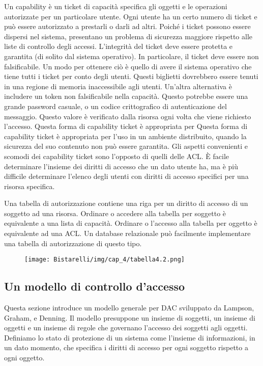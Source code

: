 Un capability è un ticket di capacità specifica gli oggetti e le operazioni autorizzate per un particolare utente. Ogni utente ha un certo numero di ticket e può essere autorizzato a prestarli o darli ad altri. Poiché i ticket possono essere dispersi nel sistema, presentano un problema di sicurezza maggiore rispetto alle liste di controllo degli accessi. L'integrità del ticket deve essere protetta e garantita (di solito dal sistema operativo). In particolare, il ticket deve essere non falsificabile. Un modo per ottenere ciò è quello di avere il sistema operativo che tiene tutti i ticket per conto degli utenti. Questi biglietti dovrebbero essere tenuti in una regione di memoria inaccessibile agli utenti. Un'altra alternativa è includere un token non falsificabile nella capacità. Questo potrebbe essere una grande password casuale, o un codice crittografico di autenticazione del messaggio. Questo valore è verificato dalla risorsa ogni volta che viene richiesto l'accesso. Questa forma di capability ticket è appropriata per Questa forma di capability ticket è appropriata per l'uso in un ambiente distribuito, quando la sicurezza del suo contenuto non può essere garantita. Gli aspetti convenienti e scomodi dei capability ticket sono l'opposto di quelli delle ACL. È facile determinare l'insieme dei diritti di accesso che un dato utente ha, ma è più difficile determinare l'elenco degli utenti con diritti di accesso specifici per una risorsa specifica.

\singlespacing

Una tabella di autorizzazione contiene una riga per un diritto di accesso di un soggetto ad una risorsa. Ordinare o accedere alla tabella per soggetto è equivalente a una lista di capacità. Ordinare o l'accesso alla tabella per oggetto è equivalente ad una ACL. Un database relazionale può facilmente implementare una tabella di autorizzazione di questo tipo.

\begin{figure}[H]
	\centering
    \texttt{[image: Bistarelli/img/cap\_4/tabella4.2.png]}
\end{figure}
\newpage
\subsection{Un modello di controllo d'accesso}
Questa sezione introduce un modello generale per DAC sviluppato da Lampson, Graham, e Denning. Il modello presuppone un insieme di soggetti, un insieme di oggetti e un insieme di regole che governano l'accesso dei soggetti agli oggetti. Definiamo lo stato di protezione di un sistema come l'insieme di informazioni, in un dato momento, che specifica i diritti di accesso per ogni soggetto rispetto a ogni oggetto.


